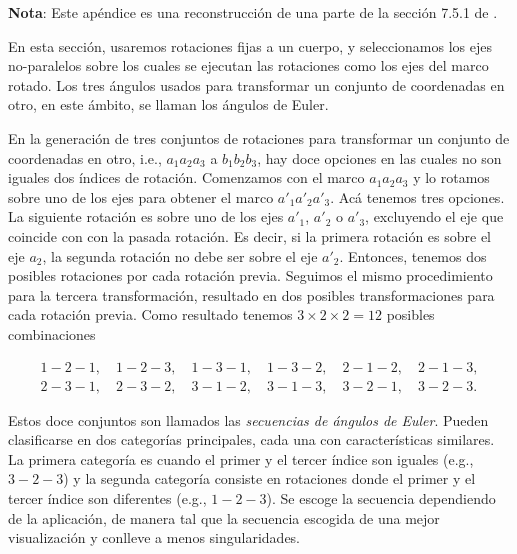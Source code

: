 \documentclass[a4paper,10pt]{article}
\numberwithin{equation}{section}
\begin{document}
\textbf{Nota}: Este apéndice es una reconstrucción de una parte de la sección 7.5.1 
de \cite{baruh}.

\vspace{.3cm}

En esta sección, usaremos rotaciones fijas a un cuerpo, y seleccionamos 
los ejes no-paralelos sobre los cuales se ejecutan las rotaciones como los ejes 
del marco rotado. Los tres ángulos usados para transformar un conjunto de coordenadas 
en otro, en este ámbito, se llaman los ángulos de Euler.

\vspace{.3cm}

En la generación de tres conjuntos de rotaciones para transformar un conjunto de 
coordenadas en otro, i.e., $a_1a_2a_3$ a $b_1b_2b_3$, hay doce opciones en las cuales 
no son iguales dos índices de rotación. Comenzamos con el marco $a_1a_2a_3$ y lo 
rotamos sobre uno de los ejes para obtener el marco $a'_1a'_2a'_3$. Acá tenemos 
tres opciones. La siguiente rotación es sobre uno de los ejes $a'_1$, $a'_2$ o $a'_3$, 
excluyendo el eje que coincide con con la pasada rotación. Es decir, si la primera 
rotación es sobre el eje $a_2$, la segunda rotación no debe ser sobre el eje $a'_2$. 
Entonces, tenemos dos posibles rotaciones por cada rotación previa. Seguimos el mismo 
procedimiento para la tercera transformación, resultado en dos posibles transformaciones 
para cada rotación previa. Como resultado tenemos $3 \times 2 \times 2 = 12$ posibles 
combinaciones 

\begin{align*}
 1-2-1,\quad 1-2-3,\quad 1-3-1,\quad 1-3-2,\quad 2-1-2,\quad 2-1-3, \\
 2-3-1,\quad 2-3-2,\quad 3-1-2,\quad 3-1-3,\quad 3-2-1,\quad 3-2-3.
\end{align*}

Estos doce conjuntos son llamados las \emph{secuencias de ángulos de Euler}. Pueden 
clasificarse en dos categorías principales, cada una con características similares. 
La primera categoría es cuando el primer y el tercer índice son iguales (e.g., $3-2-3$) 
y la segunda categoría consiste en rotaciones donde el primer y el tercer índice 
son diferentes (e.g., $1-2-3$). Se escoge la secuencia dependiendo de la aplicación, 
de manera tal que la secuencia escogida de una mejor visualización y conlleve a 
menos singularidades.
 
\vspace{.3cm}
\end{document}
